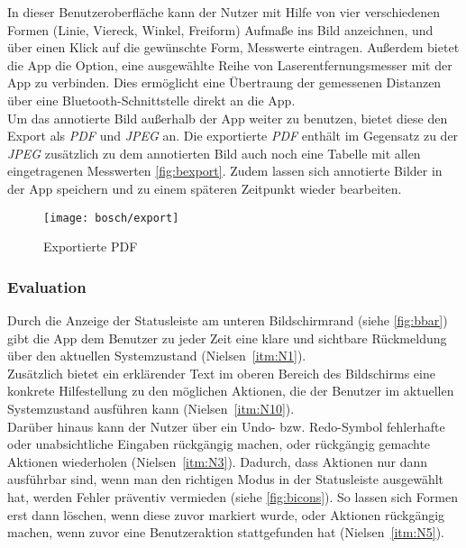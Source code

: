 In dieser Benutzeroberfläche kann der Nutzer mit Hilfe von vier verschiedenen Formen (Linie, Viereck, Winkel, Freiform) Aufmaße ins Bild anzeichnen, und über einen Klick auf die gewünschte Form, Messwerte eintragen.
Außerdem bietet die App die Option, eine ausgewählte Reihe von Laserentfernungsmesser mit der App zu verbinden.
Dies ermöglicht eine Übertraung der gemessenen Distanzen über eine Bluetooth-Schnittstelle direkt an die App. \\

Um das annotierte Bild außerhalb der App weiter zu benutzen, bietet diese den Export als \emph{PDF} und \emph{JPEG} an.
Die exportierte \emph{PDF} enthält im Gegensatz zu der \emph{JPEG} zusätzlich zu dem annotierten Bild auch noch eine Tabelle mit allen eingetragenen Messwerten \autoref{fig:bexport}. 
Zudem lassen sich annotierte Bilder in der App speichern und zu einem späteren Zeitpunkt wieder bearbeiten.

\begin{figure}[h]
  \centering
  \texttt{[image: bosch/export]}
  \caption{Exportierte PDF}\label{fig:bexport}
\end{figure}

\subsubsection{Evaluation}

Durch die Anzeige der Statusleiste am unteren Bildschirmrand (siehe \autoref{fig:bbar}) gibt die App dem Benutzer zu jeder Zeit eine klare und sichtbare Rückmeldung über den aktuellen Systemzustand (Nielsen~\autoref{itm:N1}). \\

Zusätzlich bietet ein erklärender Text im oberen Bereich des Bildschirms eine konkrete Hilfestellung zu den möglichen Aktionen, die der Benutzer im aktuellen Systemzustand ausführen kann (Nielsen~\autoref{itm:N10}). \\

Darüber hinaus kann der Nutzer über ein Undo- bzw. Redo-Symbol fehlerhafte oder unabsichtliche Eingaben rückgängig machen, oder rückgängig gemachte Aktionen wiederholen (Nielsen~\autoref{itm:N3}).
Dadurch, dass Aktionen nur dann ausführbar sind, wenn man den richtigen Modus in der Statusleiste ausgewählt hat, werden Fehler präventiv vermieden (siehe \autoref{fig:bicons}).
So lassen sich Formen erst dann löschen, wenn diese zuvor markiert wurde, oder Aktionen rückgängig machen, wenn zuvor eine Benutzeraktion stattgefunden hat (Nielsen~\autoref{itm:N5}). \\

